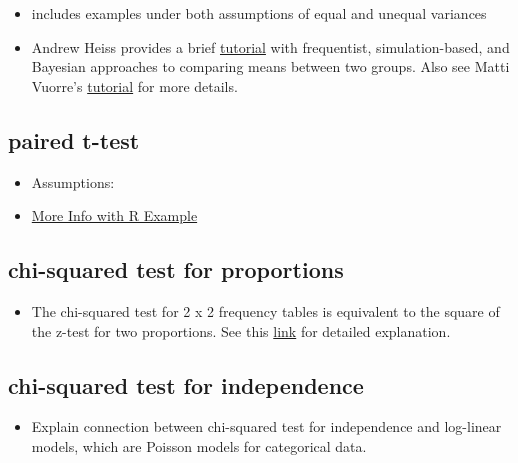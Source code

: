 \documentclass[]{book}
\providecommand{\tightlist}{%
  \setlength{\itemsep}{0pt}\setlength{\parskip}{0pt}}
\begin{document}
\begin{itemize}
  \begin{itemize}
  \item
    includes examples under both assumptions of equal and unequal variances
  \item
    Andrew Heiss provides a brief \href{https://www.andrewheiss.com/blog/2019/01/29/diff-means-half-dozen-ways/\#simulation-based-tests}{tutorial} with frequentist, simulation-based, and Bayesian approaches to comparing means between two groups. Also see Matti Vuorre's \href{https://vuorre.netlify.com/post/2017/01/02/how-to-compare-two-groups-with-robust-bayesian-estimation-using-r-stan-and-brms/\#equal-variances-t-test}{tutorial} for more details.
  \end{itemize}
\end{itemize}

\hypertarget{paired-t-test}{%
\subsection{paired t-test}\label{paired-t-test}}

\begin{itemize}
\item
  Assumptions:
\item
  \href{http://rcompanion.org/handbook/I_04.html}{More Info with R Example}
\end{itemize}

\hypertarget{chi-squared-test-for-proportions}{%
\subsection{chi-squared test for proportions}\label{chi-squared-test-for-proportions}}

\begin{itemize}
\tightlist
\item
  The chi-squared test for 2 x 2 frequency tables is equivalent to the square of the z-test for two proportions. See this \href{http://rinterested.github.io/statistics/chi_square_same_as_z_test.html}{link} for detailed explanation.
\end{itemize}

\hypertarget{chi-squared-test-for-independence}{%
\subsection{chi-squared test for independence}\label{chi-squared-test-for-independence}}

\begin{itemize}
\tightlist
\item
  Explain connection between chi-squared test for independence and log-linear models, which are Poisson models for categorical data.
\end{itemize}
\end{document}
